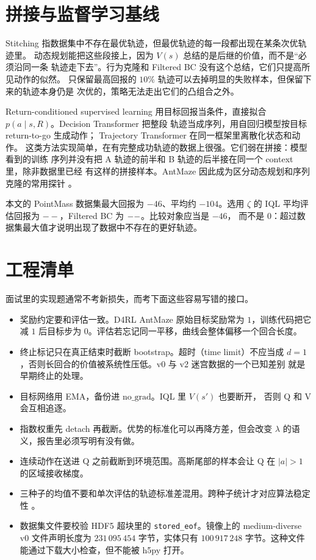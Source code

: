 \documentclass[10pt,twocolumn,a4paper]{ctexart}
\providecommand{\IqlBestStitchMean}{--}
\begin{document}
\section{拼接与监督学习基线}
Stitching 指数据集中不存在最优轨迹，但最优轨迹的每一段都出现在某条次优轨迹里。
动态规划能把这些段接上，因为 $V(s)$ 总结的是后继的价值，而不是“必须沿同一条
轨迹走下去”。行为克隆和 Filtered BC 没有这个总结，它们只提高所见动作的似然。
只保留最高回报的 $10\%$ 轨迹可以去掉明显的失败样本，但保留下来的轨迹本身仍是
次优的，策略无法走出它们的凸组合之外。

Return-conditioned supervised learning 用目标回报当条件，直接拟合
$p(a\mid s,R)$\citep{emmons2022rvs,ghosh2021gcsl}。Decision Transformer 把整段
轨迹当成序列，用自回归模型按目标 return-to-go 生成动作\citep{chen2021dt}；
Trajectory Transformer 在同一框架里离散化状态和动作\citep{janner2021tt}。
这类方法实现简单，在有完整成功轨迹的数据上很强。它们弱在拼接：模型看到的训练
序列并没有把 A 轨迹的前半和 B 轨迹的后半接在同一个 context 里，除非数据里已经
有这样的拼接样本。AntMaze 因此成为区分动态规划和序列克隆的常用探针
\citep{fu2020d4rl}。

本文的 PointMass 数据集最大回报为 $-46$、平均约 $-104$。选用 $\zeta$ 的 IQL
平均评估回报为 $\IqlBestStitchMean$，Filtered BC 为 $--$。比较对象应当是 $-46$，
而不是 $0$：超过数据集最大值才说明出现了数据中不存在的更好轨迹。

\section{工程清单}
面试里的实现题通常不考新损失，而考下面这些容易写错的接口。

\begin{itemize}
  \item 奖励约定要和评估一致。D4RL AntMaze 原始目标奖励常为 $1$，训练代码把它减
        $1$ 后目标步为 $0$。评估若忘记同一平移，曲线会整体偏移一个回合长度。
  \item 终止标记只在真正结束时截断 bootstrap。超时（time limit）不应当成
        $d=1$，否则长回合的价值被系统性压低。v0 与 v2 迷宫数据的一个已知差别
        就是早期终止的处理\citep{fu2020d4rl}。
  \item 目标网络用 EMA，备份进 $\mathrm{no\_grad}$。IQL 里 $V(s')$ 也要断开，
        否则 Q 和 V 会互相追逐。
  \item 指数权重先 detach 再截断。优势的标准化可以再降方差，但会改变 $\lambda$
        的语义，报告里必须写明有没有做。
  \item 连续动作在送进 Q 之前截断到环境范围。高斯尾部的样本会让 Q 在
        $\lvert a\rvert>1$ 的区域接收梯度。
  \item 三种子的均值不要和单次评估的轨迹标准差混用。跨种子统计才对应算法稳定性
        \citep{agarwal2021precipice}。
  \item 数据集文件要校验 HDF5 超块里的 \texttt{stored\_eof}。镜像上的
        medium-diverse v0 文件声明长度为 $231\,095\,454$ 字节，实体只有
        $100\,917\,248$ 字节。这种文件能通过下载大小检查，但不能被 h5py 打开。
\end{itemize}
\end{document}
